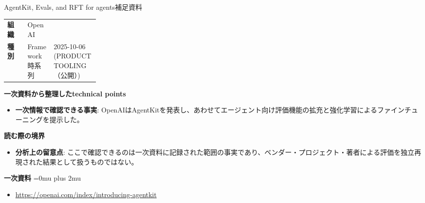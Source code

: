 \begin{technicalnote}{AgentKit, Evals, and RFT for agents}{補足資料}
\begingroup
\begin{tabularx}{\linewidth}{@{}>{\bfseries}p{0.22\linewidth}X@{}}
組織 & OpenAI \\
種別 & Framework
時系列 & 2025-10-06 (PRODUCT TOOLING（公開）) \\
\end{tabularx}
\smallskip
{\bfseries 一次資料から整理したtechnical points}
\begin{itemize}[leftmargin=1.5em,itemsep=0.35em]
\item \textbf{一次情報で確認できる事実}: OpenAIはAgentKitを発表し、あわせてエージェント向け評価機能の拡充と強化学習によるファインチューニングを提示した。
\end{itemize}
\begin{minipage}{\linewidth}
{\bfseries 読む際の境界}
\begin{itemize}[leftmargin=1.5em,itemsep=0.35em]
\item \textbf{分析上の留意点}: ここで確認できるのは一次資料に記録された範囲の事実であり、ベンダー・プロジェクト・著者による評価を独立再現された結果として扱うものではない。
\end{itemize}
\begin{samepage}
{\bfseries 一次資料}
\begingroup\sloppy
\Urlmuskip=0mu plus 2mu\relax
\begin{itemize}[leftmargin=1.5em,itemsep=0.25em]
\item {\scriptsize\url{https://openai.com/index/introducing-agentkit}}
\end{itemize}
\endgroup
\end{samepage}
\end{minipage}
\endgroup
\end{technicalnote}
\medskip

